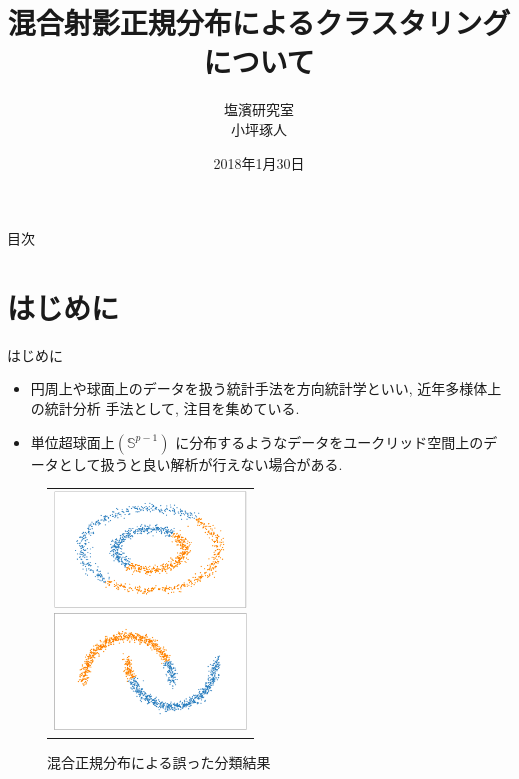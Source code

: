\documentclass[dvipdfmx]{beamer} %
\title[タイトル]{混合射影正規分布によるクラスタリングについて}
\author[発表者名]{塩濱研究室\\ 小坪琢人}
\institute[所属]{東京理科大学\ 工学部経営工学科4年\\学籍番号 4414036}
\date[日付]{2018年1月30日}
\begin{document}
\begin{frame}[plain]
\titlepage
\end{frame}

\begin{frame}{目次}
\tableofcontents
\end{frame}

\section{はじめに}
\begin{frame}{はじめに}

\begin{itemize}
\item 
円周上や球面上のデータを扱う統計手法を方向統計学といい, 近年多様体上の統計分析
手法として, 注目を集めている.
\vspace{0.2cm}
\item 
単位超球面上$(\mathbb{S}^{p-1})$ に分布するようなデータをユークリッド空間上のデータとして扱うと良い解析が行えない場合がある.
\end{itemize}

\begin{figure}[H]
 \begin{tabular}{c}
 \begin{minipage}{0.5\hsize}
  \begin{center}
   \includegraphics[clip,height= 31mm]{data/sample_mixture_miss2.png}
  \end{center}
 \end{minipage}
 \begin{minipage}{0.5\hsize}
  \begin{center}
 \includegraphics[clip,height= 31mm]{data/sample_mixture_miss1.png}
  \end{center}
 \end{minipage}
\end{tabular}
\caption{混合正規分布による誤った分類結果}
\end{figure}

\end{frame}
\end{document}
